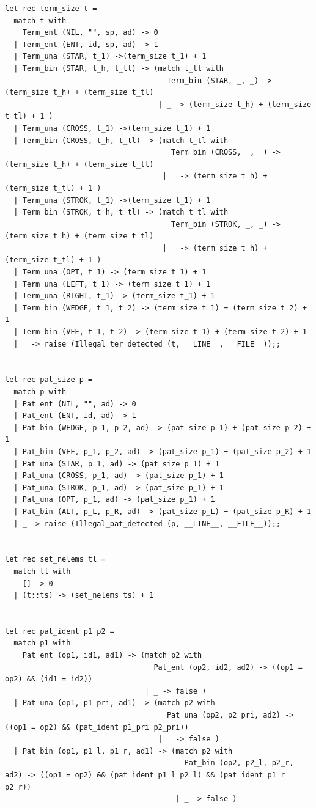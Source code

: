 \documentclass[12pt]{article}
\begin{document}
\begin{tiny}
\begin{verbatim}
let rec term_size t =
  match t with
    Term_ent (NIL, "", sp, ad) -> 0
  | Term_ent (ENT, id, sp, ad) -> 1
  | Term_una (STAR, t_1) ->(term_size t_1) + 1
  | Term_bin (STAR, t_h, t_tl) -> (match t_tl with
                                     Term_bin (STAR, _, _) -> (term_size t_h) + (term_size t_tl)
                                   | _ -> (term_size t_h) + (term_size t_tl) + 1 )
  | Term_una (CROSS, t_1) ->(term_size t_1) + 1
  | Term_bin (CROSS, t_h, t_tl) -> (match t_tl with
                                      Term_bin (CROSS, _, _) -> (term_size t_h) + (term_size t_tl)
                                    | _ -> (term_size t_h) + (term_size t_tl) + 1 )
  | Term_una (STROK, t_1) ->(term_size t_1) + 1
  | Term_bin (STROK, t_h, t_tl) -> (match t_tl with
                                      Term_bin (STROK, _, _) -> (term_size t_h) + (term_size t_tl)
                                    | _ -> (term_size t_h) + (term_size t_tl) + 1 )
  | Term_una (OPT, t_1) -> (term_size t_1) + 1
  | Term_una (LEFT, t_1) -> (term_size t_1) + 1
  | Term_una (RIGHT, t_1) -> (term_size t_1) + 1
  | Term_bin (WEDGE, t_1, t_2) -> (term_size t_1) + (term_size t_2) + 1
  | Term_bin (VEE, t_1, t_2) -> (term_size t_1) + (term_size t_2) + 1
  | _ -> raise (Illegal_ter_detected (t, __LINE__, __FILE__));;


let rec pat_size p =
  match p with
  | Pat_ent (NIL, "", ad) -> 0
  | Pat_ent (ENT, id, ad) -> 1
  | Pat_bin (WEDGE, p_1, p_2, ad) -> (pat_size p_1) + (pat_size p_2) + 1
  | Pat_bin (VEE, p_1, p_2, ad) -> (pat_size p_1) + (pat_size p_2) + 1
  | Pat_una (STAR, p_1, ad) -> (pat_size p_1) + 1
  | Pat_una (CROSS, p_1, ad) -> (pat_size p_1) + 1
  | Pat_una (STROK, p_1, ad) -> (pat_size p_1) + 1
  | Pat_una (OPT, p_1, ad) -> (pat_size p_1) + 1
  | Pat_bin (ALT, p_L, p_R, ad) -> (pat_size p_L) + (pat_size p_R) + 1
  | _ -> raise (Illegal_pat_detected (p, __LINE__, __FILE__));;


let rec set_nelems tl =
  match tl with
    [] -> 0
  | (t::ts) -> (set_nelems ts) + 1


let rec pat_ident p1 p2 =
  match p1 with
    Pat_ent (op1, id1, ad1) -> (match p2 with
                                  Pat_ent (op2, id2, ad2) -> ((op1 = op2) && (id1 = id2))
                                | _ -> false )
  | Pat_una (op1, p1_pri, ad1) -> (match p2 with
                                     Pat_una (op2, p2_pri, ad2) -> ((op1 = op2) && (pat_ident p1_pri p2_pri))
                                   | _ -> false )
  | Pat_bin (op1, p1_l, p1_r, ad1) -> (match p2 with
                                         Pat_bin (op2, p2_l, p2_r, ad2) -> ((op1 = op2) && (pat_ident p1_l p2_l) && (pat_ident p1_r p2_r))
                                       | _ -> false )



\end{verbatim}
\end{tiny}
\end{document}
